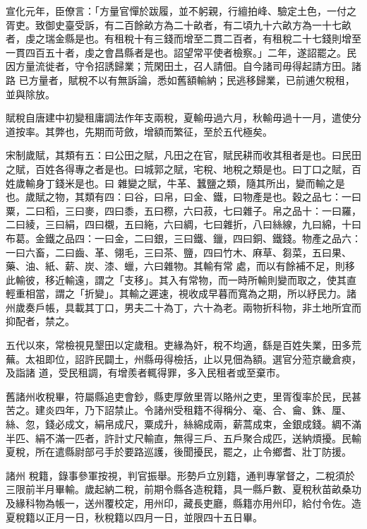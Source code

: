 \begin{pinyinscope}
 宣化元年，臣僚言：「方量官憚於跋履，並不躬親，行繵拍峰、驗定土色，一付之胥吏。致御史臺受訴，有二百餘畝方為二十畝者，有二頃九十六畝方為一十七畝者，虔之瑞金縣是也。有租稅十有三錢而增至二貫二百者，有租稅二十七錢則增至一貫四百五十者，虔之會昌縣者是也。詔望常平使者檢察。」二年，遂詔罷之。民因方量流徙者，守令招誘歸業；荒閑田土，召人請佃。自今諸司毋得起請方田。諸路
 已方量者，賦稅不以有無訴論，悉如舊額輸納；民逃移歸業，已前逋欠稅租，並與除放。



 賦稅自唐建中初變租庸調法作年支兩稅，夏輸毋過六月，秋輸毋過十一月，遣使分道按率。其弊也，先期而苛斂，增額而繁征，至於五代極矣。



 宋制歲賦，其類有五：曰公田之賦，凡田之在官，賦民耕而收其租者是也。曰民田之賦，百姓各得專之者是也。曰城郭之賦，宅稅、地稅之類是也。曰丁口之賦，百姓歲輸身丁錢米是也。曰
 雜變之賦，牛革、蠶鹽之類，隨其所出，變而輸之是也。歲賦之物，其類有四：曰谷，曰帛，曰金、鐵，曰物產是也。穀之品七：一曰粟，二曰稻，三曰麥，四曰黍，五曰穄，六曰菽，七曰雜子。帛之品十：一曰羅，二曰綾，三曰絹，四曰櫬，五曰絁，六曰綢，七曰雜折，八曰絲線，九曰綿，十曰布葛。金鐵之品四：一曰金，二曰銀，三曰鐵、鑞，四曰銅、鐵錢。物產之品六：一曰六畜，二曰齒、革、翎毛，三曰茶、鹽，四曰竹木、麻草、芻菜，五曰果、藥、油、紙、薪、炭、漆、蠟，六曰雜物。其輸有常
 處，而以有餘補不足，則移此輸彼，移近輸遠，謂之「支移」。其入有常物，而一時所輸則變而取之，使其直輕重相當，謂之「折變」。其輸之遲速，視收成早暮而寬為之期，所以紓民力。諸州歲奏戶帳，具載其丁口，男夫二十為丁，六十為老。兩物折科物，非土地所宜而抑配者，禁之。



 五代以來，常檢視見墾田以定歲租。吏緣為奸，稅不均適，繇是百姓失業，田多荒蕪。太祖即位，詔許民闢土，州縣毋得檢括，止以見佃為額。選官分蒞京畿倉瘐，及詣諸
 道，受民租調，有增羨者輒得罪，多入民租者或至棄市。



 舊諸州收稅畢，符屬縣追吏會鈔，縣吏厚斂里胥以賂州之吏，里胥復率於民，民甚苦之。建炎四年，乃下詔禁止。令諸州受租籍不得稱分、毫、合、龠、銖、厘、絲、忽，錢必成文，絹帛成尺，粟成升，絲綿成兩，薪蒿成束，金銀成錢。綢不滿半匹、絹不滿一匹者，許計丈尺輸直，無得三戶、五戶聚合成匹，送納煩擾。民輸夏稅，所在遣縣尉部弓手於要路巡護，後聞擾民，罷之，止令鄉耆、壯丁防援。



 諸州
 稅籍，錄事參軍按視，判官振舉。形勢戶立別籍，通判專掌督之，二稅須於三限前半月畢輸。歲起納二稅，前期令縣各造稅籍，具一縣戶數、夏稅秋苗畝桑功及緣科物為帳一，送州覆校定，用州印，藏長吏廳，縣籍亦用州印，給付令佐。造夏稅籍以正月一日，秋稅籍以四月一日，並限四十五日畢。




\end{pinyinscope}
